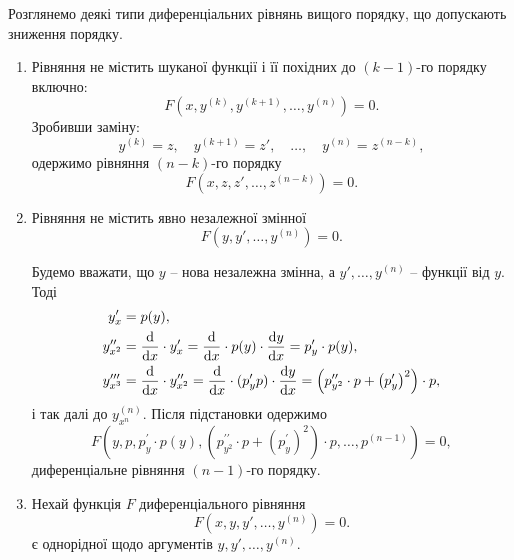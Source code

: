 Розглянемо деякі типи диференціальних рівнянь вищого порядку, що допускають зниження порядку.
\begin{enumerate}
\item Рівняння не містить шуканої функції і її похідних до $(k-1)$-го порядку включно:
\begin{equation}
	\label{eq:2.3.1}
	F \left( x, y^{(k)}, y^{(k + 1)}, \ldots, y^{(n)} \right) = 0.
\end{equation}
Зробивши заміну:
\begin{equation}
	\label{eq:2.3.2}
	y^{(k)} = z, \quad y^{(k + 1)} = z', \quad \ldots, \quad y^{(n)} = z^{(n - k)},
\end{equation}
одержимо рівняння $(n-k)$-го порядку
\begin{equation}
	\label{eq:2.3.3}
	F \left( x, z, z', \ldots, z^{(n - k)} \right) = 0.
\end{equation}

\item Рівняння не містить явно незалежної змінної
\begin{equation}
	\label{eq:2.3.4}
	F \left( y, y', \ldots, y^{(n)} \right) = 0.
\end{equation}

Будемо вважати, що $y$ -- нова незалежна змінна, а $y', \ldots, y^{(n)}$ -- функції від $y$. Тоді
\begin{align}
	\label{eq:2.3.5}
	y_x^\prime &= p(y), \\
	\label{eq:2.3.6}
	y_{x^2}^{\prime\prime} &= \frac{\diff}{\diff x} \cdot y_x^\prime = \frac{\diff}{\diff x} \cdot p(y) \cdot \frac{\diff y}{\diff x} = p_y^{\prime} \cdot  p(y), \\
	\label{eq:2.3.7}
	y_{x^3}^{\prime\prime\prime} &= \frac{\diff}{\diff x} \cdot y_{x^2}^{\prime\prime} = \frac{\diff}{\diff x} \cdot (p_y^\prime p) \cdot \frac{\diff y}{\diff x} = \left( p_{y^2}^{\prime\prime} \cdot p + \left( p_y^\prime \right)^2 \right) \cdot p,
\end{align}
і так далі до $y_{x^n}^{(n)}$. Після підстановки одержимо 
\begin{equation}
	\label{eq:2.3.8}
	F \left( y, p, p_y^{\prime} \cdot  p(y), \left( p_{y^2}^{\prime\prime} \cdot p + \left( p_y^\prime \right)^2 \right) \cdot p, \ldots, p^{(n - 1)} \right) = 0,
\end{equation}
диференціальне рівняння $(n-1)$-го порядку.
\item Нехай функція $F$ диференціального рівняння
\begin{equation}
	\label{eq:2.3.9}
	F \left( x, y, y', \ldots, y^{(n)} \right) = 0.
\end{equation}
є однорідної щодо аргументів  $y, y', \ldots, y^{(n)}$. \\


\end{enumerate}
